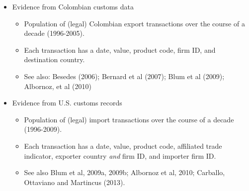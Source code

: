 \documentclass[notes=show]{beamer}
\begin{document}
\begin{frame}%


\begin{itemize}
\item Evidence from Colombian customs data

\begin{itemize}
\item Population of (legal) Colombian export transactions over the course of
a decade (1996-2005).

\item Each transaction has a date, value, product code, firm ID, and
destination country.

\item See also: Besedes (2006); Bernard et al (2007); Blum et al (2009);
Albornoz, et al (2010)
\end{itemize}

\item Evidence from U.S. customs records

\begin{itemize}
\item Population of (legal) import transactions over the course of a decade
(1996-2009).

\item Each transaction has a date, value, product code, affiliated trade
indicator, exporter country \textit{and} firm ID, and importer firm ID.

\item See also Blum et al, 2009a, 2009b; Albornoz et al, 2010; Carballo,
Ottaviano and Martincus (2013).
\end{itemize}
\end{itemize}

\end{frame}%
\end{document}
